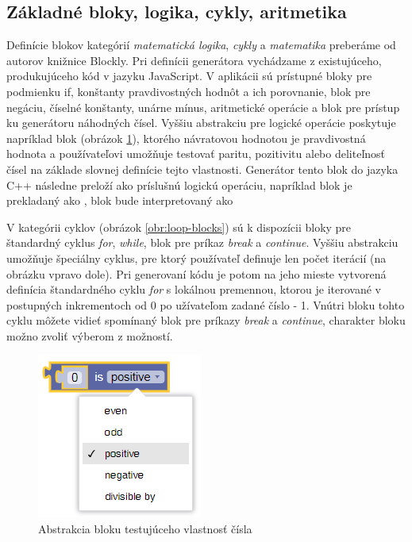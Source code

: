 \subsection{Základné bloky, logika, cykly, aritmetika}
Definície blokov kategórií \textit{matematická logika}, \textit{cykly} a \textit{matematika} preberáme od autorov knižnice Blockly. Pri definícii generátora vychádzame z existujúceho, produkujúceho kód v jazyku JavaScript. V aplikácii sú prístupné bloky pre podmienku if, konštanty pravdivostných hodnôt a ich porovnanie, blok pre negáciu, číselné konštanty, unárne mínus, aritmetické operácie a blok pre prístup ku generátoru náhodných čísel. Vyššiu abstrakciu pre logické operácie poskytuje napríklad blok  (obrázok \ref{obr:block-number-property}), ktorého návratovou hodnotou je pravdivostná hodnota a používateľovi umožňuje testovať paritu, pozitivitu alebo deliteľnosť čísel na základe slovnej definície tejto vlastnosti. Generátor tento blok do jazyka C++ následne preloží ako príslušnú logickú operáciu, napríklad blok  je prekladaný ako , blok  bude interpretovaný ako  

V kategórii cyklov (obrázok \ref{obr:loop-blocks}) sú k dispozícii bloky pre štandardný cyklus \textit{for}, \textit{while}, blok pre príkaz \textit{break} a \textit{continue}. Vyššiu abstrakciu umožňuje špeciálny cyklus, pre ktorý používateľ definuje len počet iterácií (na obrázku vpravo dole). Pri generovaní kódu je potom na jeho mieste vytvorená definícia štandardného cyklu \textit{for} s lokálnou premennou, ktorou je iterované v postupných inkrementoch od 0 po užívateľom zadané číslo - 1. Vnútri bloku tohto cyklu môžete vidieť spomínaný blok pre príkazy \textit{break} a \textit{continue}, charakter bloku možno zvoliť výberom z možností.

\begin{figure}
\centerline{\includegraphics[]{images/block-number-property}}
\caption[Abstrakcia bloku testujúceho vlastnosť čísla]{Abstrakcia bloku testujúceho vlastnosť čísla}
\label{obr:block-number-property}
\end{figure}

